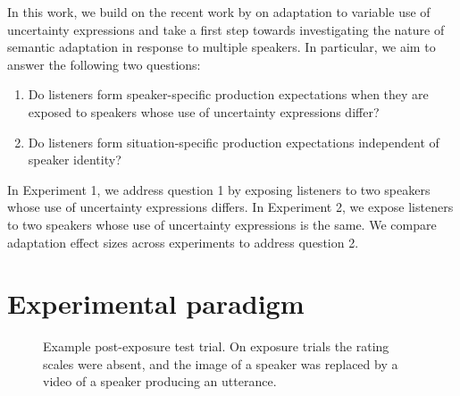 In this work, we build on the recent work by \cite{Schuster2018} on 
adaptation to variable use of uncertainty expressions and 
take a first step towards investigating the nature of semantic adaptation 
in response to multiple speakers. 
In particular,
we aim to answer the following two questions:
\begin{enumerate}
    \item Do listeners form speaker-specific production expectations when they are 
             exposed to speakers whose use of uncertainty expressions differ? 
    \item Do listeners form situation-specific production expectations independent of speaker identity?
\end{enumerate}    

In Experiment 1, we address question 1 by exposing listeners to two
speakers whose use of uncertainty expressions differs. In Experiment 2, we expose listeners to two speakers whose use of uncertainty expressions is the same. We compare adaptation effect sizes across experiments to address question 2.

\section{Experimental paradigm}



\begin{figure}
\caption{Example post-exposure test trial. On exposure trials the rating scales were absent, and the image of a speaker was replaced by a video of a speaker producing an utterance.  \label{fig:post-exposure}}
\end{figure}

